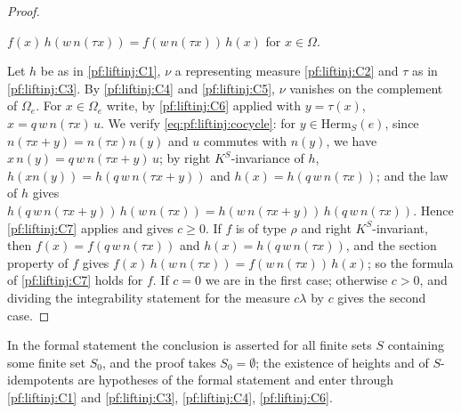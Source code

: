 \begin{proof}
\begin{enumerate}[label=(C\arabic*)]
$f(x)\,h(w\,n(\tau x))=f(w\,n(\tau x))\,h(x)$ for $x\in\Omega$.
\end{enumerate}
Let $h$ be as in \ref{pf:liftinj:C1}, $\nu$ a representing measure \ref{pf:liftinj:C2} and $\tau$ as in \ref{pf:liftinj:C3}. By \ref{pf:liftinj:C4}
and \ref{pf:liftinj:C5}, $\nu$ vanishes on the complement of $\Omega_e$. For $x\in\Omega_e$ write, by \ref{pf:liftinj:C6} applied with $y=\tau(x)$,
$x=q\,w\,n(\tau x)\,u$. We verify \eqref{eq:pf:liftinj:cocycle}: for $y\in\mathrm{Herm}_S(e)$, since $n(\tau x+y)=n(\tau x)n(y)$ and $u$ commutes with
$n(y)$, we have $x\,n(y)=q\,w\,n(\tau x+y)\,u$; by right $K^S$-invariance of $h$, $h(xn(y))=h(q\,w\,n(\tau x+y))$ and $h(x)=h(q\,w\,n(\tau x))$; and
the law of $h$ gives $h(q\,w\,n(\tau x+y))\,h(w\,n(\tau x))=h(w\,n(\tau x+y))\,h(q\,w\,n(\tau x))$. Hence \ref{pf:liftinj:C7} applies and gives $c\ge0$.
If $f$ is of type $\rho$ and right $K^S$-invariant, then $f(x)=f(q\,w\,n(\tau x))$ and $h(x)=h(q\,w\,n(\tau x))$, and the section property of $f$ gives
$f(x)\,h(w\,n(\tau x))=f(w\,n(\tau x))\,h(x)$; so the formula of \ref{pf:liftinj:C7} holds for $f$. If $c=0$ we are in the first case; otherwise
$c>0$, and dividing the integrability statement for the measure $c\lambda$ by $c$ gives the second case.
\end{proof}

\begin{remark}\label{pf:liftinj:mucellrem}
In the formal statement the conclusion is asserted for all finite sets $S$ containing some finite set $S_0$, and the proof takes $S_0=\emptyset$; the
existence of heights and of $S$-idempotents are hypotheses of the formal statement and enter through \ref{pf:liftinj:C1} and \ref{pf:liftinj:C3},
\ref{pf:liftinj:C4}, \ref{pf:liftinj:C6}.
\end{remark}

